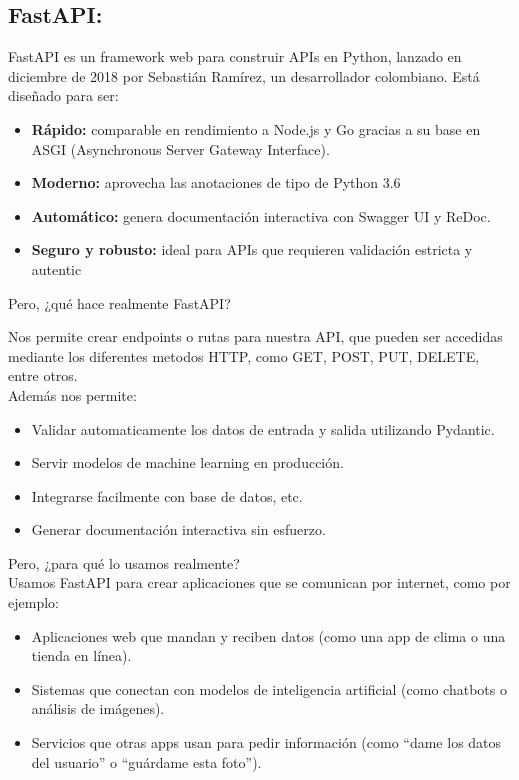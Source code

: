 \documentclass[12pt]{article}
\begin{document}
\subsection*{FastAPI:}
FastAPI es un framework web para construir APIs en Python, lanzado en diciembre de 2018 por Sebastián Ramírez, un desarrollador colombiano. Está diseñado para ser:
\begin{itemize}
    \item \textbf{Rápido:} comparable en rendimiento a Node.js y Go gracias a su base en ASGI (Asynchronous Server Gateway Interface).
    \item \textbf{Moderno:} aprovecha las anotaciones de tipo de Python 3.6  
    \item \textbf{Automático:} genera documentación interactiva con Swagger UI y ReDoc.
    \item \textbf{Seguro y robusto:} ideal para APIs que requieren validación estricta y autentic
\end{itemize}
Pero,  ¿qué hace realmente FastAPI?

Nos permite crear endpoints o rutas para nuestra API, que pueden ser accedidas mediante los diferentes metodos HTTP, como GET, POST, PUT, DELETE, entre otros.\\
Además nos permite:
\begin{itemize}
    \item Validar automaticamente los datos de entrada y salida utilizando Pydantic.
    \item Servir modelos de machine learning en producción. 
    \item Integrarse facilmente con base de datos, etc.
    \item Generar documentación interactiva sin esfuerzo.
\end{itemize}

Pero, ¿para qué lo usamos realmente?\\
Usamos FastAPI para crear aplicaciones que se comunican por internet, como por ejemplo:
\begin{itemize}
    \item Aplicaciones web que mandan y reciben datos (como una app de clima o una tienda en línea).
    \item Sistemas que conectan con modelos de inteligencia artificial (como chatbots o análisis de imágenes).
    \item Servicios que otras apps usan para pedir información (como “dame los datos del usuario” o “guárdame esta foto”).
\end{itemize}
\end{document}
